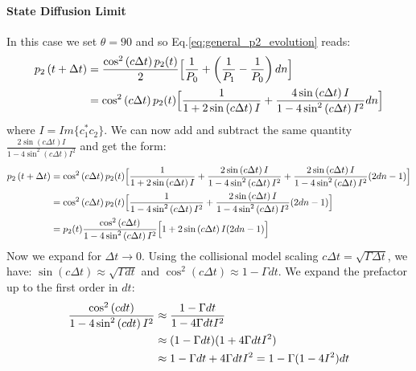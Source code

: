\documentclass[a4paper,12pt]{article}
\begin{document}
\paragraph{State Diffusion Limit}
In this case we set $ \theta = 90 $ and so Eq.\ref{eq:general_p2_evolution} reads: 
\begin{align}
	p_{2} \left( t + \Delta t \right) &= \frac{\cos^{2} \left( c \Delta t \right) p_{2} (t)}{2}\Big[ \frac{1}{P_{0}} + \left( \frac{1}{P_{1}} - \frac{1}{P_{0}} \right) dn \Big] \notag \\
	&= \cos^{2} \left( c \Delta t \right) p_{2} (t)\Big[ \frac{1}{1 + 2 \sin \left(c \Delta t\right) I } + \frac{4 \sin \left(c \Delta t\right) I}{1 - 4 \sin^{2} \left(c \Delta t\right) I^{2}} dn \Big] \label{eq:SD_p2_evolution}
\end{align}
where $ I = Im \{ c_{1}^{*}c_{2} \} $. We can now add and subtract the same quantity $  \frac{2 \sin \left(c \Delta t\right) I}{1 - 4 \sin^{2} \left(c \Delta t\right) I^{2}} $ and get the form:
\begin{align}
	p_{2} \left( t + \Delta t \right) &= \cos^{2} \left( c \Delta t \right) p_{2} (t)\Big[ \frac{1}{1 + 2 \sin \left(c \Delta t\right) I } + \frac{2 \sin \left(c \Delta t\right) I}{1 - 4 \sin^{2} \left(c \Delta t\right) I^{2}} + \frac{2 \sin \left(c \Delta t\right) I}{1 - 4 \sin^{2} \left(c \Delta t\right) I^{2}} (2dn - 1) \Big] \notag \\
	&= \cos^{2} \left( c \Delta t \right) p_{2} (t)\Big[ \frac{1}{1 - 4 \sin^{2} \left(c \Delta t\right) I^{2}} + \frac{2 \sin \left(c \Delta t\right) I}{1 - 4 \sin^{2} \left(c \Delta t\right) I^{2}} (2dn - 1) \Big] \notag \\
	&= p_{2}(t) \frac{\cos^{2} \left( c \Delta t \right)}{1 - 4 \sin^{2} \left( c \Delta t \right) I^{2}} \Big[ 1 + 2 \sin \left(c \Delta t\right) I (2dn - 1) \Big]
	\label{eq:SD_p2_factored}
\end{align}
Now we expand for $\Delta t \to 0$. Using the collisional model scaling $ c \Delta t = \sqrt{\Gamma \Delta t}$, we have:
$ \sin(c \Delta t) \approx \sqrt{\Gamma dt}$  and $ \cos^2(c \Delta t) \approx 1 - \Gamma dt$.
We expand the prefactor up to the first order in $dt$:
\begin{align}
	\frac{\cos^{2} \left( c dt \right)}{1 - 4 \sin^{2} \left( c dt \right) I^{2}} &\approx \frac{1 - \Gamma dt}{1 - 4 \Gamma dt I^{2}} \notag \\
	&\approx (1 - \Gamma dt)(1 + 4 \Gamma dt I^{2}) \notag \\
	&\approx 1 - \Gamma dt + 4 \Gamma dt I^{2} = 1 - \Gamma (1 - 4I^{2}) dt
	\label{eq:SD_prefactor_expansion}
\end{align}
\end{document}
